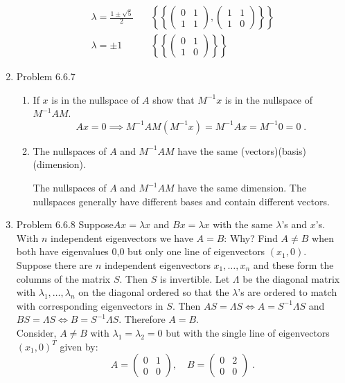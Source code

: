\documentclass[a4paper]{article}
\begin{document}
\begin{enumerate}
\begin{align*}
\lambda = \frac{1\pm \sqrt{5}}{2} \quad &\left\lbrace\left\lbrace
\begin{pmatrix}0&1\\1&1\end{pmatrix},
\begin{pmatrix}1&1\\1&0\end{pmatrix}\right\rbrace\right\rbrace \\
\lambda = \pm 1 \quad &\left\lbrace \left\lbrace
\begin{pmatrix} 0&1\\1&0 \end{pmatrix}\right\rbrace \right\rbrace
\end{align*}

\item{Problem 6.6.7}
\begin{enumerate}
	\item
	If $x$ is in the nullspace of $A$ show that $M^{-1}x$ is in
	the nullspace of $M^{-1}AM$. 
	$$
	Ax = 0 \implies M^{-1}AM(M^{-1}x) = M^{-1}Ax = M^{-1}0 = 0\;.
	$$
	\item 
	The nullspaces of $A$ and $M^{-1}AM$ have the same 
	(vectors)(basis)(dimension). 
	
	The nullspaces of $A$ and $M^{-1}AM$ have the same dimension.
	The nullspaces generally have different bases and contain 
	different vectors. 	
\end{enumerate}

\item{Problem 6.6.8} Suppose$ Ax = \lambda x$ and $Bx = \lambda x$ with the same $\lambda$'s and $x$'s. With $n$ independent 
eigenvectors we have $A = B$: Why? Find $A \neq B$ when both have eigenvalues 0,0 but only one line of eigenvectors $(x_1, 0)$.\\

Suppose there are $n$ independent eigenvectors $x_1, \dots , x_n$ and these form the columns of the matrix $S$. Then $S$ is invertible. Let $\Lambda$ be the diagonal matrix with $\lambda_1, \dots , \lambda_n$ on the diagonal ordered so that the $\lambda$'s are ordered to match with corresponding eigenvectors in $S$. Then $AS = \Lambda S \iff A = S^{-1}\Lambda S$ and $BS = \Lambda S \iff B =  S^{-1}\Lambda S$. Therefore $A = B$. \\

Consider, $A\neq B$ with $\lambda_1 = \lambda_2 = 0$ but with the single line of eigenvectors $(x_1, 0)^T$ given by:
$$
A = \begin{pmatrix} 0& 1 \\ 0 & 0 \end{pmatrix}, 
\quad
B = \begin{pmatrix} 0& 2 \\ 0 & 0 \end{pmatrix} \;.
$$


\end{enumerate}
\end{document}
